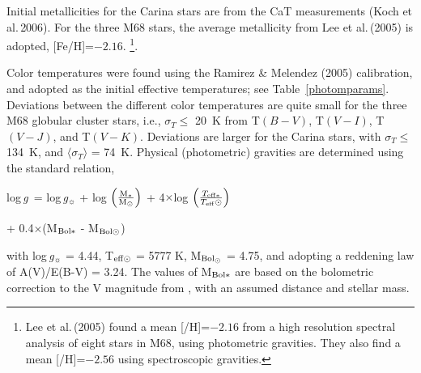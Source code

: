 \documentclass{emulateapj}
\newcommand\logg{log\,{\it g}}
\newcommand\etal{{\rm et al.\,}}
\begin{document}
Initial metallicities for the Carina stars are from the CaT 
measurements (Koch \etal 2006). For the three M68 stars, the
average metallicity from Lee \etal (2005) is adopted,
[Fe/H]=$-2.16$. 
\footnote{
Lee \etal (2005) found a mean [/H]=$-2.16$ from a high 
resolution spectral analysis of eight stars in M68, using photometric 
gravities.   They also find a mean [/H]=$-2.56$ using 
spectroscopic gravities.}.
 
Color temperatures were found using the Ramirez \& Melendez (2005)
calibration, and adopted as the initial effective temperatures;
see Table~\ref{photomparams}. 
%
%  
Deviations between the different color temperatures are 
quite small for the three M68 globular cluster stars, 
i.e.,  $\sigma_T \le$ 20~K from T$(B-V)$, T$(V-I)$, 
T$(V-J)$, and T$(V-K)$.
Deviations are larger for the Carina stars, 
with $\sigma_T \le$ 134~K, and $\langle \sigma_T \rangle$ = 74~K.
% 
Physical (photometric) gravities are determined using the 
standard relation, 

\vspace{0.1in}
\logg \, = \logg$_\sun$  + log $\left({\rm M}_*\over{{\rm M}_\odot}\right)$ + 4$\times$log $\left({T_{\rm eff*}}\over{T_{\rm eff}\odot}\right)$

\vspace{0.05in}
\hspace{1.0in} + 0.4$\times$(M$_{\rm Bol*}$ - M$_{\rm Bol\odot}$)

\vspace{0.1in}
\noindent
with \logg$_\sun$ = 4.44, T$_{\rm eff\odot}$ = 5777 K, M$_{\rm Bol_\odot}$ = 4.75,
and adopting a reddening law of A(V)/E(B-V) = 3.24.    The values of
M$_{\rm Bol*}$ are based on the bolometric correction to the V magnitude 
from \citet{Alo99}, with an assumed distance and stellar mass.
\end{document}
